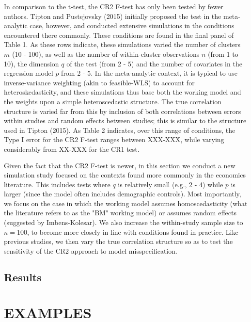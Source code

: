 \documentclass[12pt]{article}\usepackage[]{graphicx}\usepackage[]{color}
\begin{document}

In comparison to the t-test, the CR2 F-test has only been tested by fewer authors.
Tipton and Pustejovsky (2015) initially proposed the test in the meta-analytic case, however, and conducted extensive simulations in the conditions encountered there commonly. 
These conditions are found in the final panel of Table 1.
As these rows indicate, these simulations varied the number of clusters $m$ (10 - 100), as well as the number of within-cluster observations $n$ (from 1 to 10), the dimension $q$ of the test (from 2 - 5) and the number of covariates in the regression model $p$ from 2 - 5. 
In the meta-analytic context, it is typical to use inverse-variance weighting (akin to feasible-WLS) to account for heteroskedasticity, and these simulations thus base both the working model and the weights upon a simple heteroscedastic structure. 
The true correlation structure is varied far from this by inclusion of both correlations between errors within studies and random effects between studies; this is similar to the structure used in Tipton (2015). 
As Table 2 indicates, over this range of conditions, the Type I error for the CR2 F-test ranges between XXX-XXX, while varying considerably from XX-XXX for the CR1 test.

Given the fact that the CR2 F-test is newer, in this section we conduct a new simulation study focused on the contexts found more commonly in the economics literature.
This includes tests where $q$ is relatively small (e.g., 2 - 4) while $p$ is larger (since the model often includes demographic controls).
Most importantly, we focus on the case in which the working model assumes homoscedasticity (what the literature refers to as the "BM" working model) or assumes random effects (suggested by Imbens-Kolesar).
We also increase the within-study sample size to $n = 100$, to become more closely in line with conditions found in practice. 
Like previous studies, we then vary the true correlation structure so as to test the sensitivity of the CR2 approach to model misspecification.


\subsection{Results}


\section{EXAMPLES}
\label{subsec:examples_F}
\end{document}
